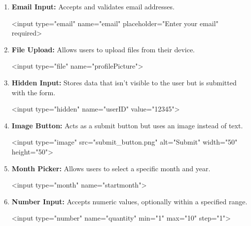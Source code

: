 \documentclass{report}
\begin{document}
\begin{itemize}
\begin{enumerate}
            \item \textbf{Email Input:} Accepts and validates email addresses.
                \bigbreak \noindent 
                \begin{htmlcode}
                    <input type="email" name="email" placeholder="Enter your email" required>
                \end{htmlcode}
                
            \item \textbf{File Upload:} Allows users to upload files from their device.
                \bigbreak \noindent 
                \begin{htmlcode}
                    <input type="file" name="profilePicture">
                \end{htmlcode}

            \item \textbf{Hidden Input:} Stores data that isn't visible to the user but is submitted with the form.
                \bigbreak \noindent 
                \begin{htmlcode}
                    <input type="hidden" name="userID" value="12345">
                \end{htmlcode}
                
            \item \textbf{Image Button:} Acts as a submit button but uses an image instead of text.
                \bigbreak \noindent 
                \begin{htmlcode}
                    <input type="image" src="submit_button.png" alt="Submit" width="50" height="50">
                \end{htmlcode}
                
            \item \textbf{Month Picker:} Allows users to select a specific month and year.
                \bigbreak \noindent 
                \begin{htmlcode}
                    <input type="month" name="startmonth">
                \end{htmlcode}
                
            \item \textbf{Number Input:} Accepts numeric values, optionally within a specified range.
                \bigbreak \noindent 
                \begin{htmlcode}
                    <input type="number" name="quantity" min="1" max="10" step="1">
                \end{htmlcode}
                

\end{enumerate}
\end{itemize}
\end{document}
